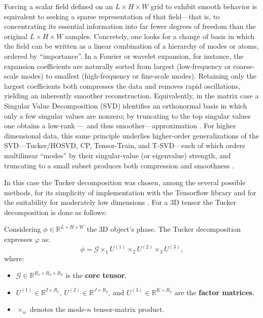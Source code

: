 Forcing a scalar field defined on an  $L\times H\times W$ grid to exhibit smooth behavior is equivalent to seeking a 
sparse representation of that field—that is, to concentrating its essential information into far fewer degrees of freedom 
than the original $L\times H\times W$ samples. 
Concretely, one looks for a change of basis in which the field can be written as a linear combination of a hierarchy 
of modes or atoms, ordered by ``importance''. In a Fourier or wavelet expansion, for instance, the expansion coefficients 
are naturally sorted from largest (low-frequency or coarse-scale modes) to smallest (high-frequency or fine-scale modes). 
Retaining only the largest coefficients both compresses the data and removes rapid oscillations, yielding an inherently 
smoother reconstruction. Equivalently, in the matrix case a Singular Value Decomposition (SVD) identifies an orthonormal 
basis in which only a few singular values are nonzero; by truncating to the top singular values one obtains a low-rank 
— and thus smoother—approximation \cite{golub1996matrix}. For higher dimensional data, this same principle underlies 
higher-order generalizations of the SVD—Tucker/HOSVD, CP, Tensor-Train, and T-SVD—each of which orders multilinear 
“modes” by their singular-value (or eigenvalue) strength, and truncating to a small subset produces both compression 
and smoothness \cite{Kolda_TT}. 

In this case the Tucker decomposition was chosen, among the several possible methods, for its simplicity of implementation 
with the Tensorflow library and for the suitability for moderately low dimensions \cite{Oseledets_TT}. 
For a 3D tensor the Tucker decomposition is done as follows: 

Considering \(\mathcal{\phi} \in \mathbb{R}^{L \times H \times W}\) the 3D object's phase. The Tucker decomposition expresses \(\mathcal{\varphi}\) as:
\[
\mathcal{\phi} = \mathcal{G} \times_1 U^{(1)} \times_2 U^{(2)} \times_3 U^{(3)},
\]
where:
\begin{itemize}
  \item \(\mathcal{G} \in \mathbb{R}^{R_1 \times R_2 \times R_3}\) is the \textbf{core tensor},
  \item \(U^{(1)} \in \mathbb{R}^{I \times R_1}\), \(U^{(2)} \in \mathbb{R}^{J \times R_2}\), and \(U^{(3)} \in \mathbb{R}^{K \times R_3}\) are the \textbf{factor matrices},
  \item \(\times_n\) denotes the mode-\(n\) tensor-matrix product.
\end{itemize}

